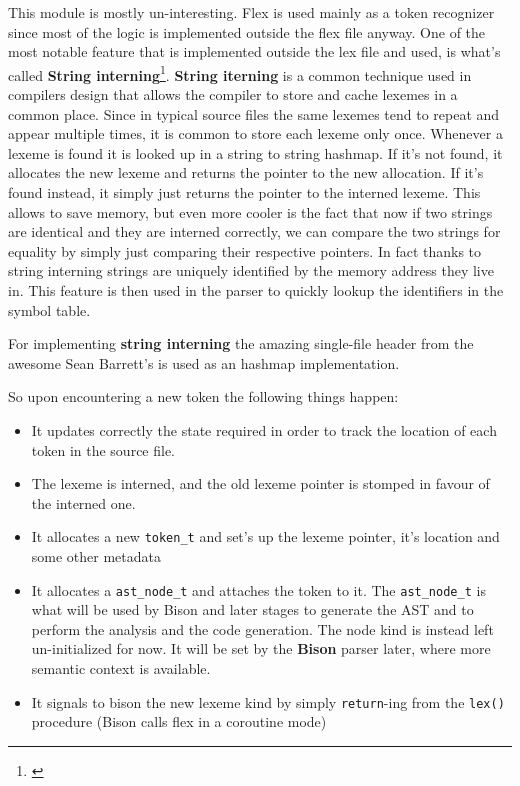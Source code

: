 \documentclass[a4paper]{article}
\newcommand{\urlref}[3][blue]{\href{#2}{\color{#1}{#3}}}%
\begin{document}
This module is mostly un-interesting. Flex is used mainly as a token recognizer since most of the logic is implemented outside the flex
file anyway. One of the most notable feature that is implemented outside the lex file and used,
is what's called \textbf{String interning}\footnote{\urlref{https://en.wikipedia.org/wiki/String_interning}{String Interning Wikipedia Article}}.
\textbf{String iterning} is a common technique used in compilers design that allows the compiler to
store and cache lexemes in a common place. Since in typical source files
the same lexemes tend to repeat and appear multiple times, it is common to store each lexeme only once. Whenever
a lexeme is found it is looked up in a string to string hashmap. If it's not found, it allocates
the new lexeme and returns the pointer to the new allocation. If it's found instead, it simply just returns the pointer to the interned lexeme. This allows to save
memory, but even more cooler is the fact that now if two strings are identical and they are interned correctly,
we can compare the two strings for equality by simply just comparing their respective pointers. In fact
thanks to string interning strings are uniquely identified by the memory address they live in.
This feature is then used in the parser
to quickly lookup the identifiers in the symbol table.

For implementing \textbf{string interning} the amazing \urlref{https://github.com/nothings/stb/blob/master/stb_ds.h}{stb\_ds.h} single-file header
from  the awesome Sean Barrett's \urlref{https://github.com/nothings/stb}{stb libraries} is used as an hashmap implementation.

So upon encountering a new token the following things happen:

\begin{itemize}
\item It updates correctly the state required in order to track the location of each token in the source file.
\item The lexeme is interned, and the old lexeme pointer is stomped in favour of the interned one.
\item It allocates a new \texttt{token\_t} and set's up the lexeme pointer, it's location and some other metadata
\item It allocates a \texttt{ast\_node\_t} and attaches the token to it. The \texttt{ast\_node\_t} is what will be
    used by Bison and later stages to generate the AST and to perform the analysis and the code generation. The node
    kind is instead left un-initialized for now. It will be set by the \textbf{Bison} parser later, where more semantic context is available.
\item It signals to bison the new lexeme kind by simply \texttt{return}-ing from the \texttt{lex()} procedure (Bison calls flex in a coroutine mode)
\end{itemize}
\end{document}
